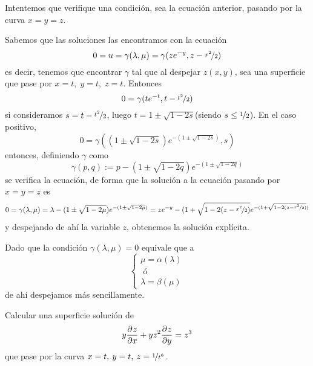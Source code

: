     \begin{obs}
        Intentemos que verifique una condición, sea la ecuación anterior, pasando por la curva $x=y=z$.

        Sabemos que las soluciones las encontramos con la ecuación
        $$0=u=\gamma(\lambda,\mu)=\gamma(z e^{-y}, z- \nicefrac{x^2}{2} )$$
        es decir, tenemos que encontrar $\gamma$ tal que al despejar $z(x,y)$, sea una superficie que pase por $
            x=t, \; y=t, \;  z=t$. Entonces
            $$0=\gamma(t e^{-t}, t- \nicefrac{t^2}{2})$$
            si consideramos $s=t -\nicefrac{t^2}{2}$, luego $t=1\pm \sqrt{1-2s}$(siendo $s \leq \nicefrac{1}{2}$). En el caso positivo, 
            $$0=\gamma((1\pm \sqrt{1-2s})e^{-(1\pm \sqrt{1-2s})},s)$$
            entonces, definiendo $\gamma$ como 
            $$\gamma(p,q):= p - (1\pm \sqrt{1-2q})e^{-(1\pm \sqrt{1-2q})} $$
            se verifica la ecuación, de forma que la solución a la ecuación pasando por $x=y=z$ es 
            $$0=\gamma(\lambda,\mu)=\lambda- (1\pm \sqrt{1-2\mu})e^{-(1\pm \sqrt{1-2\mu})}=ze^{-y} - (1+\sqrt{1-2(z- \nicefrac{x^2}{2})} e^{-(1+\sqrt{1-2(z- \nicefrac{x^2}{2})})}$$
            y despejando de ahí la variable $z$, obtenemos la solución explícita.
    \end{obs}
    \begin{obs}
        Dado que la condición $\gamma(\lambda,\mu)=0$ equivale que a 
        $$\left\{ \begin{array}{l}
             \mu=\alpha(\lambda)  \\
             \text{ ó } \\
             \lambda=\beta(\mu) 
        \end{array} \right.$$
        de ahí despejamos más sencillamente.
    \end{obs}
    \begin{ejer}
        Calcular una superficie solución de 
        $$y \frac{\partial^{} z}{\partial x} + yz^2 \frac{\partial^{} z}{\partial y}=z^3$$
        que pase por la curva $x=t, \: y=t, \: z=\nicefrac{1}{t^6}$. 
    \end{ejer}
